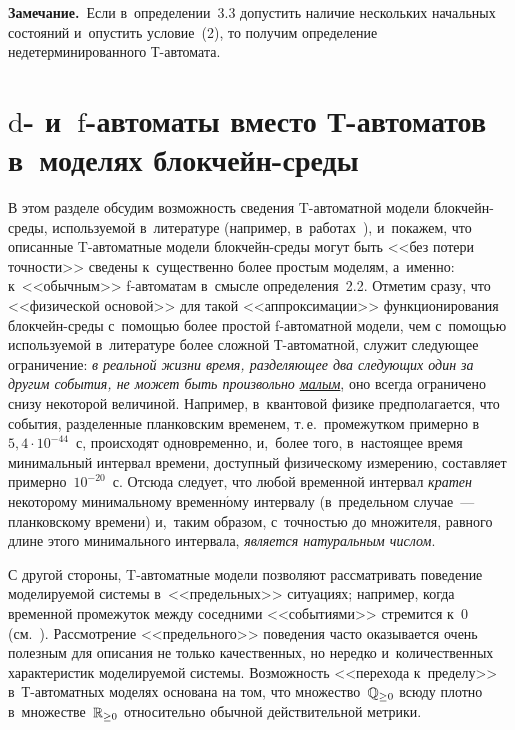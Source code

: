 \begin{multicols}{2}
\noindent
\textbf{Замечание.}\
Если в~определении~3.3 допустить наличие нескольких начальных
состояний и~опустить условие~(2), то получим определение недетерминированного
Т-ав\-то\-мата.

\vspace*{-6pt}

\section{$\mathrm d$- и~$\mathrm f$-автоматы вместо Т-автоматов в~моделях блокчейн-среды}
\label{sec:T-block}

\vspace*{-3pt}

В этом разделе обсудим возможность сведения T-ав\-то\-мат\-ной модели блок\-чейн-сре\-ды,
используемой в~литературе (например, в~работах~\cite{Bitcoin-contract-model,Model-bitcoin-uppaal}),
и~покажем, что описанные T-ав\-то\-мат\-ные  модели блок\-чейн-среды могут быть <<без
потери точ\-ности>>  сведены  к~существенно более простым моделям,
а~именно: к~<<обычным>>  \mbox{f-ав}\-то\-ма\-там в~смысле определения~2.2.
Отметим сразу, что <<физической основой>> для такой <<аппроксимации>> функционирования
блокчейн-среды с~помощью более простой \mbox{f-ав}\-то\-мат\-ной модели, чем  с~помощью
используемой в~литературе более сложной \mbox{Т-ав}\-то\-мат\-ной,
служит следующее ограничение:
\textit{в реальной жизни время, разделяющее два следующих один за другим события,
не может быть произвольно \underline{малым}}, оно всегда ограничено снизу некоторой
величиной. Например, в~квантовой физике предполагается, что события,\linebreak
 разделенные
планковским временем, т.\,е.\ промежутком примерно в~$5,4\cdot 10^{-44}$~с,
происходят\linebreak
 одновременно, и,~более того, в~настоящее время минимальный интервал
времени, доступный физическому измерению, составляет примерно~$10^{-20}$~с. 
Отсюда следует, что любой временной интервал \textit{кратен} некоторому
минимальному временн$\acute{\mbox{о}}$му интервалу (в~предельном случае~--- планковскому времени)
и,~таким образом, с~точностью до множителя, равного длине этого минимального
интервала, \textit{является  натуральным числом}.

С другой стороны, T-ав\-то\-мат\-ные модели
позволяют рассматривать поведение моделируемой сис\-те\-мы в~<<предельных>>
ситуациях; например,  когда временной промежуток между соседними <<событиями>>
стремится к~0 (см.~\cite[example 3.22]{timed-auto}). Рас\-смот\-ре\-ние <<предельного>>
поведения часто оказывается очень полезным для описания не только качественных,
но нередко и~количественных характеристик моделируемой системы. Возможность
<<перехода к~пределу>> в~Т-ав\-то\-мат\-ных моделях основана на том, что
 множество~$\mathbb{Q}_{\ge 0}$ всюду плотно в~множестве~$\mathbb{R}_{\ge 0}$ относительно обычной действительной
метрики.


\end{multicols}
